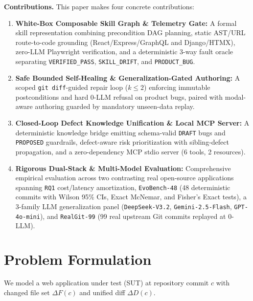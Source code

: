 \documentclass[conference]{IEEEtran}
\begin{document}
\textbf{Contributions.} This paper makes four concrete contributions:
\begin{enumerate}
  \item \textbf{White-Box Composable Skill Graph \& Telemetry Gate:} A formal skill representation combining precondition DAG planning, static AST/URL route-to-code grounding (React/Express/GraphQL and Django/HTMX), zero-LLM Playwright verification, and a deterministic 3-way fault oracle separating \texttt{VERIFIED\_PASS}, \texttt{SKILL\_DRIFT}, and \texttt{PRODUCT\_BUG}.
  \item \textbf{Safe Bounded Self-Healing \& Generalization-Gated Authoring:} A scoped \texttt{git diff}-guided repair loop ($k \le 2$) enforcing immutable postconditions and hard 0-LLM refusal on product bugs, paired with modal-aware authoring guarded by mandatory unseen-data replay.
  \item \textbf{Closed-Loop Defect Knowledge Unification \& Local MCP Server:} A deterministic knowledge bridge emitting schema-valid \texttt{DRAFT} bugs and \texttt{PROPOSED} guardrails, defect-aware risk prioritization with sibling-defect propagation, and a zero-dependency MCP stdio server (6 tools, 2 resources).
  \item \textbf{Rigorous Dual-Stack \& Multi-Model Evaluation:} Comprehensive empirical evaluation across two contrasting real open-source applications spanning \texttt{RQ1} cost/latency amortization, \texttt{EvoBench-48} (48 deterministic commits with Wilson 95\% CIs, Exact McNemar, and Fisher's Exact tests), a 3-family LLM generalization panel (\texttt{DeepSeek-V3.2}, \texttt{Gemini-2.5-Flash}, \texttt{GPT-4o-mini}), and \texttt{RealGit-99} (99 real upstream Git commits replayed at 0-LLM).
\end{enumerate}

\section{Problem Formulation}
We model a web application under test (SUT) at repository commit $c$ with changed file set $\Delta F(c)$ and unified diff $\Delta D(c)$.
\end{document}
